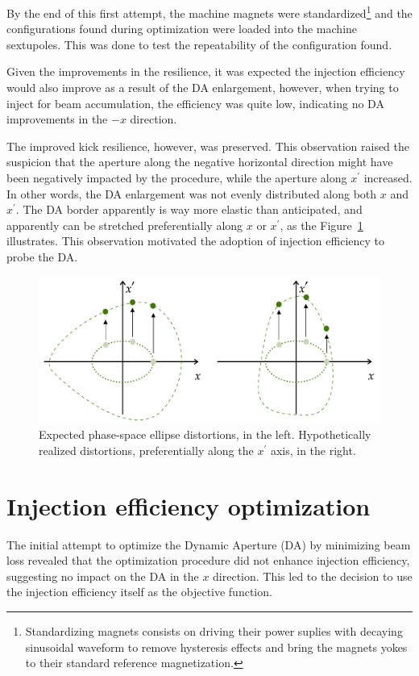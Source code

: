 By the end of this first attempt, the machine magnets were standardized\footnote{Standardizing magnets consists on driving their power suplies with decaying sinusoidal waveform to remove hysteresis effects and bring the magnets yokes to their standard reference magnetization.} and the configurations found during optimization were loaded into the machine sextupoles. This was done to test the repeatability of the configuration found. 

Given the improvements in the resilience, it was expected the injection efficiency would also improve as a result of the DA enlargement, however, when trying to inject for beam accumulation, the efficiency was quite low, indicating no DA improvements in the $-x$ direction. 

The improved kick resilience, however, was preserved. This observation raised the suspicion that the aperture along the negative horizontal direction might have been negatively impacted by the procedure, while the aperture along $x^\prime$ increased. In other words, the DA enlargement was not evenly distributed along both $x$ and $x^\prime$. The DA border apparently is way more elastic than anticipated, and apparently can be stretched preferentially along $x$ or $x^\prime$, as the Figure~\ref{fig:expected_vs_reality_DA} illustrates. This observation motivated the adoption of injection efficiency to probe the DA.
\begin{figure}
    \centering
    \includegraphics[width=\textwidth]{Images/elastic_phase_space_distortion.pdf}
    \caption[Expected phase-space ellipse distortions vs. hypothetically realized distortions.]{Expected phase-space ellipse distortions, in the left. Hypothetically realized distortions, preferentially along the $x^\prime$ axis, in the right.}
    \label{fig:expected_vs_reality_DA}
\end{figure}
\section{Injection efficiency optimization}
The initial attempt to optimize the Dynamic Aperture (DA) by minimizing beam loss revealed that the optimization procedure did not enhance injection efficiency, suggesting no impact on the DA in the $x$ direction. This led to the decision to use the injection efficiency itself as the objective function. 

